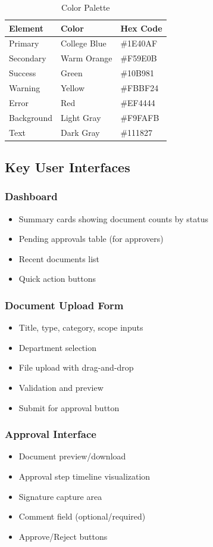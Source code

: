 \begin{table}[H]
\centering
\begin{tabular}{lll}
\toprule
\textbf{Element} & \textbf{Color} & \textbf{Hex Code} \\
\midrule
Primary & College Blue & \#1E40AF \\
Secondary & Warm Orange & \#F59E0B \\
Success & Green & \#10B981 \\
Warning & Yellow & \#FBBF24 \\
Error & Red & \#EF4444 \\
Background & Light Gray & \#F9FAFB \\
Text & Dark Gray & \#111827 \\
\bottomrule
\end{tabular}
\caption{Color Palette}
\end{table}

\subsection{Key User Interfaces}

\subsubsection{Dashboard}
\begin{itemize}
\item Summary cards showing document counts by status
\item Pending approvals table (for approvers)
\item Recent documents list
\item Quick action buttons
\end{itemize}

\subsubsection{Document Upload Form}
\begin{itemize}
\item Title, type, category, scope inputs
\item Department selection
\item File upload with drag-and-drop
\item Validation and preview
\item Submit for approval button
\end{itemize}

\subsubsection{Approval Interface}
\begin{itemize}
\item Document preview/download
\item Approval step timeline visualization
\item Signature capture area
\item Comment field (optional/required)
\item Approve/Reject buttons
\end{itemize}

